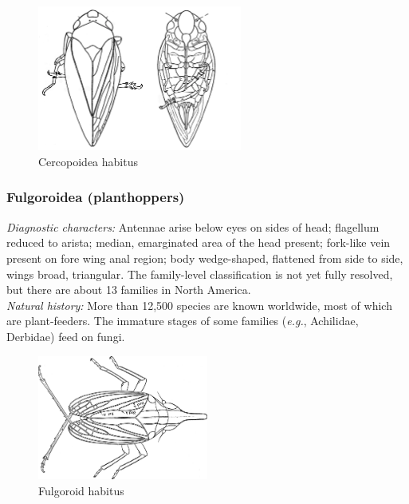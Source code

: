 \documentclass[letterpaper, 11pt]{article}
\begin{document}
\begin{figure}[ht!]
 \centering
 \includegraphics[width=0.6\textwidth]{cercopoidHabitus.png}
 \caption{Cercopoidea habitus \citep[][Fig. 18]{bhlitem140074}}
 \label{fig:cercopid}
\end{figure}

\subsubsection{Fulgoroidea (planthoppers)}
\noindent{}\textit{Diagnostic characters:} Antennae arise below eyes on sides of head; flagellum reduced to arista; median, emarginated area of the head present; fork-like vein present on fore wing anal region; body wedge-shaped, flattened from side to side, wings broad, triangular. The family-level classification is not yet fully resolved, but there are about 13 families in North America.\\

\noindent{}\textit{Natural history:} More than 12,500 species are known worldwide, most of which are plant-feeders. The immature stages of some families (\textit{e.g.}, Achilidae, Derbidae) feed on fungi.\\

\begin{figure}[ht!]
 \centering
 \includegraphics[width=0.5\textwidth]{fulgoroid.png}
 \caption{Fulgoroid habitus \citep[Modified from][Fig. 1]{britton1923hemiptera}}
 \label{fig:delphacid1}
\end{figure}
\end{document}
